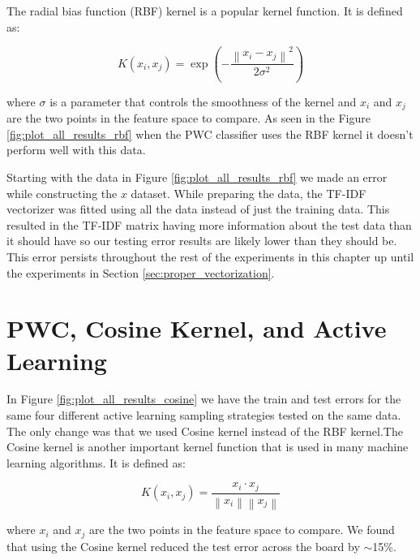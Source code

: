 The radial bias function (RBF) kernel is a popular kernel function. It is defined as:

\begin{equation}
    K(x_i, x_j) = \exp\left(- \frac{\left\| x_i - x_j \right\|^2}{2 \sigma^2}\right)
\label{eq:rbf_kernel}
\end{equation}

where $\sigma$ is a parameter that controls the smoothness of the kernel and $x_i$ and $x_j$ are the two points in the feature space to compare. As seen in the Figure \ref{fig:plot_all_results_rbf} when the PWC classifier uses the RBF kernel it doesn't perform well with this data.

Starting with the data in Figure \ref{fig:plot_all_results_rbf} we made an error while constructing the $x$ dataset. While preparing the data, the TF-IDF vectorizer was fitted using all the data instead of just the training data. This resulted in the TF-IDF matrix having more information about the test data than it should have so our testing error results are likely lower than they should be. This error persists throughout the rest of the experiments in this chapter up until the experiments in Section \ref{sec:proper_vectorization}.

\section{PWC, Cosine Kernel, and Active Learning}

In Figure \ref{fig:plot_all_results_cosine} we have the train and test errors for the same four different active learning sampling strategies tested on the same data. The only change was that we used Cosine kernel instead of the RBF kernel.The Cosine kernel is another important kernel function that is used in many machine learning algorithms. It is defined as:

\begin{equation}
    K(x_i, x_j) = \frac{x_i \cdot x_j}{\left\| x_i \right\| \left\| x_j \right\|}
\label{eq:cosine_kernel}
\end{equation}

where $x_i$ and $x_j$ are the two points in the feature space to compare. We found that using the Cosine kernel reduced the test error across the board by $\sim$15\%.  

